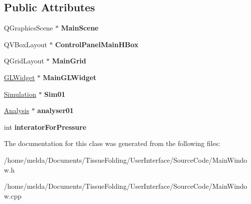 \subsection*{Public Attributes}
\begin{DoxyCompactItemize}
\item 
\hypertarget{classMainWindow_a9604326eab0369c7de6be01f992e0ba7}{}Q\+Graphics\+Scene $\ast$ {\bfseries Main\+Scene}\label{classMainWindow_a9604326eab0369c7de6be01f992e0ba7}

\item 
\hypertarget{classMainWindow_a80b2787fc058a3f5141b905d6c69c0ad}{}Q\+V\+Box\+Layout $\ast$ {\bfseries Control\+Panel\+Main\+H\+Box}\label{classMainWindow_a80b2787fc058a3f5141b905d6c69c0ad}

\item 
\hypertarget{classMainWindow_a028cf99e2842ca1250d4c103310c3430}{}Q\+Grid\+Layout $\ast$ {\bfseries Main\+Grid}\label{classMainWindow_a028cf99e2842ca1250d4c103310c3430}

\item 
\hypertarget{classMainWindow_aebd88a36f5ea16df9a037f7591090856}{}\hyperlink{classGLWidget}{G\+L\+Widget} $\ast$ {\bfseries Main\+G\+L\+Widget}\label{classMainWindow_aebd88a36f5ea16df9a037f7591090856}

\item 
\hypertarget{classMainWindow_aedd252a3fb1c0e6c7fe2d9edb5d19b83}{}\hyperlink{classSimulation}{Simulation} $\ast$ {\bfseries Sim01}\label{classMainWindow_aedd252a3fb1c0e6c7fe2d9edb5d19b83}

\item 
\hypertarget{classMainWindow_a9e4a6528d514c55da4fc890b1def63fb}{}\hyperlink{classAnalysis}{Analysis} $\ast$ {\bfseries analyser01}\label{classMainWindow_a9e4a6528d514c55da4fc890b1def63fb}

\item 
\hypertarget{classMainWindow_ae37b6a1ead599733ddefed609c59a30d}{}int {\bfseries interator\+For\+Pressure}\label{classMainWindow_ae37b6a1ead599733ddefed609c59a30d}

\end{DoxyCompactItemize}


The documentation for this class was generated from the following files\+:\begin{DoxyCompactItemize}
\item 
/home/melda/\+Documents/\+Tissue\+Folding/\+User\+Interface/\+Source\+Code/Main\+Window.\+h\item 
/home/melda/\+Documents/\+Tissue\+Folding/\+User\+Interface/\+Source\+Code/Main\+Window.\+cpp\end{DoxyCompactItemize}

